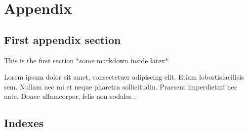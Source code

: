 \appendix{}

\section{Appendix}
 
\subsection{First appendix section}
This is the first section *some markdown inside latex*
 
Lorem  ipsum  dolor  sit  amet,  consectetuer  adipiscing  
elit.   Etiam  lobortisfacilisis sem.  Nullam nec mi et 
neque pharetra sollicitudin.  Praesent imperdietmi nec ante. 
Donec ullamcorper, felis non sodales...
 
\subsection{Indexes}

\listoffigures
\listoftables
\listofalgorithms